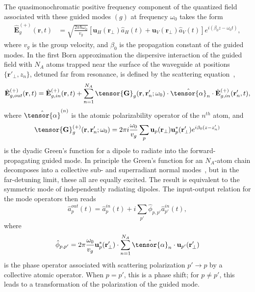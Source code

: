 \documentclass[preprint,aps,pra,onecolumn,superscriptaddress]{revtex4-1} %
\def\br{\mathbf{r}}
\newcommand{\mbf}[1]{\mathbf{#1}}
\begin{document}
The quasimonochromatic positive frequency component of the quantized field associated with these guided modes $(g)$ at frequency $\omega_0$ takes the form
\begin{align}\label{eq:Ebp}
\hat{\mathbf{E}}^{(+)}_g(\mbf{r}, t) &= \sqrt{ \frac{2 \pi \hbar \omega_0}{ v_g} } \left[\mathbf{u}_H(\mbf{r}\!_\perp)  \hat{a}_H(t) + \mathbf{u}_V(\mbf{r}\!_\perp) \hat{a}_V(t)\right]  e^{i (\beta_0 z- \omega_0 t)},
\end{align}
where $v_g$ is the group velocity, and $ \beta_0 $ is the propagation constant of the guided modes.  In the first Born approximation the dispersive interaction of the guided field with $N_A$ atoms trapped near the surface of the waveguide at positions $\{\mbf{r}'_\perp, z_n\}$, detuned far from resonance,  is defined by the scattering equation~\cite{Qi2016},
\begin{equation}
\hat{\mathbf{E}}^{(+)}_{g,out}(\mbf{r}, t)=\hat{\mathbf{E}}^{(+)}_{g,in}(\mbf{r}, t)+\sum_{n=1}^{N_A} \tensor{\mbf{G}}_{g} (\mbf{r}, \mbf{r}'_n;\omega_0) \cdot \hat{\tensor{\alpha}}_n \cdot \hat{\mathbf{E}}^{(+)}_{g,in}(\mbf{r}'_n, t),
\end{equation}
where $\hat{\tensor{\alpha}}^{(n)}$ is the atomic polarizability operator of the $n^{th}$ atom, and 
\begin{equation}
		\tensor{\mathbf{G}}^{(+)}_g(\br,\br'_n; \omega_0) =  2\pi i \frac{\omega_0}{v_g } \sum_{p} \mathbf{u}_{p} (\br_\perp)\mathbf{u}^*_{p} 
(\br_{\perp}^\prime) e^{i \beta_0(z-z'_n)}  \label{Eq::GreensGuided}
\end{equation}
is the dyadic Green's function for a dipole to radiate into the forward-propagating guided mode.  In principle the Green's function for an $N_A$-atom chain decomposes into a collective sub- and superradiant normal modes~\cite{Asenjo-Garcia2017Atom,Asenjo-Garcia2017Exponential}, but in the far-detuning limit, these all are equally excited.  The result is equivalent to the symmetric mode of independently radiating dipoles.  The input-output relation for the mode operators then reads~\cite{Qi2016}
\begin{equation}
\hat{a}^{out}_p(t) = \hat{a}^{in}_p(t)  +i \sum_{p'} \hat{\phi}_{p,p'} \hat{a}^{in}_{p'}(t) ,
\end{equation}
where 
\begin{equation}
\hat{\phi}_{p,p'} = 2\pi \frac{\omega_0}{v_g} \mbf{u}^*_p (\mbf{r}'_\perp) \cdot \sum_{n=1}^{N_A} \hat{\tensor{\alpha}}_n \cdot \mbf{u}_{p'} (\mbf{r}'_\perp)
\end{equation}
is the phase operator associated with scattering polarization $p' \rightarrow p$ by a collective atomic operator.  When $p=p'$, this is a phase shift; for $p \neq p'$, this leads to a transformation of the polarization of the guided mode.
\end{document}

